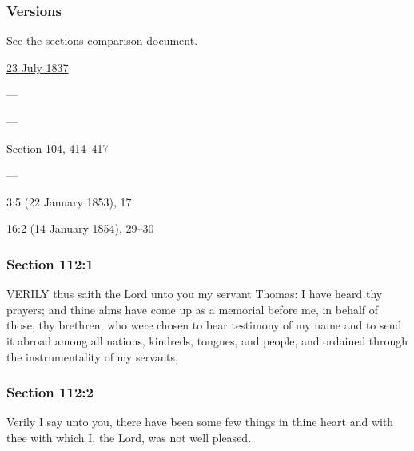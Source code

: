 	\subsubsection{Versions}
		\label{DC112-V}
		
		See the \href{https://drive.google.com/file/d/1goAvNz8jS4R8slYfMG_db55Ty2z_vmgK/view?usp=sharing}{sections comparison} document.
	
		\begin{compactdesc}
			\item[JSP] \hyperref[EMS-1837-JS-23-JUL-1837]{23 July 1837}
			\item[BC] ---
			\item[DC 1835] ---
			\item[DC 1844] Section 104, 414--417
			\item[TS] ---
			\item[DN] 3:5 (22 January 1853), 17
			\item[MS] 16:2 (14 January 1854), 29--30
		\end{compactdesc}

	\subsubsection{Section 112:1} %
		\label{DC112-1}

		VERILY thus saith the Lord unto you my servant Thomas: I have heard thy prayers; and thine alms have come up as a memorial before me, in behalf of those, thy brethren, who were chosen to bear testimony of my name and to send it abroad among all nations, kindreds, tongues, and people, and ordained through the instrumentality of my servants,


	\subsubsection{Section 112:2} %
		\label{DC112-2}

		Verily I say unto you, there have been some few things in thine heart and with thee with which I, the Lord, was not well pleased.

